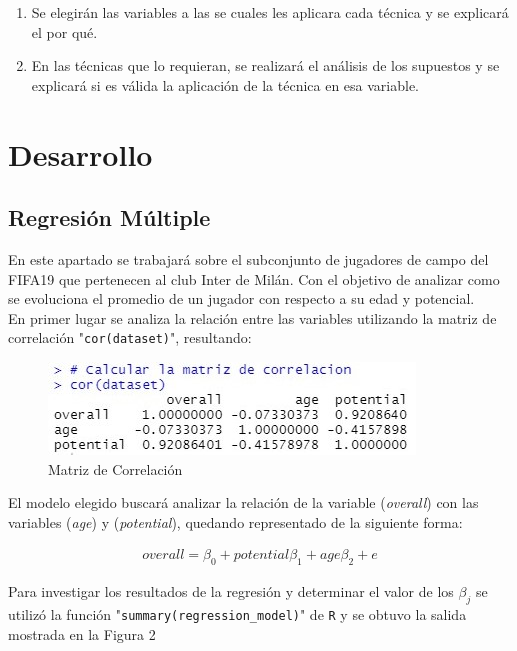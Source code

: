 \documentclass[a4paper,10pt,twocolumn]{article}
\begin{document}
\begin{enumerate}
	\item Se elegirán las variables a las se cuales les aplicara cada técnica y se explicará el por qué.
	\item En las técnicas que lo requieran,  se realizará el análisis de los supuestos y se explicará si es válida la aplicación de la técnica en esa variable.
\end{enumerate}


\section*{Desarrollo}\label{sec:dev}
  
\subsection*{Regresión Múltiple}

En este apartado se trabajará sobre el subconjunto de jugadores de campo del FIFA19 que pertenecen al club Inter de Milán. Con el objetivo de analizar como se evoluciona el promedio de un jugador con respecto a su edad y potencial.\\
En primer lugar se analiza la relación entre las variables utilizando la matriz de correlación "\verb|cor(dataset)|", resultando:

\begin{figure}[h]
	\includegraphics[scale=0.86]{./imgs/reg_correlation.jpg}
	\caption{Matriz de Correlación}
\end{figure}

El modelo elegido buscará analizar la relación de la variable (\textit{overall}) con las variables (\textit{age}) y (\textit{potential}), quedando representado de la siguiente forma:

\begin{align*}
overall = \beta_0 + potential \beta_1 + age \beta_2 + e
\end{align*}

Para investigar los resultados de la regresión y determinar el valor de los $\beta_j$ se utilizó la función "\verb|summary(regression_model)|" de \verb|R| y se obtuvo la salida mostrada en la Figura 2\\
\end{document}
